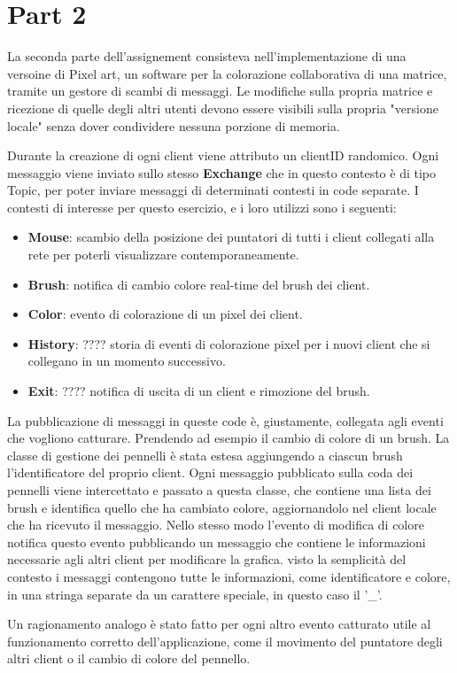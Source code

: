\chapter{Part 2}
\label{ch:into} %

La seconda parte dell'assignement consisteva nell'implementazione di una versoine di Pixel art, un software per la colorazione 
collaborativa di una matrice, tramite un gestore di scambi di messaggi. Le modifiche sulla propria matrice e ricezione di quelle degli altri utenti 
devono essere visibili sulla propria "versione locale" senza dover condividere nessuna porzione di memoria.

Durante la creazione di ogni client viene attributo un clientID randomico. Ogni messaggio viene inviato sullo stesso \textbf{Exchange} che in questo contesto
è di tipo Topic, per poter inviare messaggi di determinati contesti in code separate. I contesti di interesse per questo esercizio, e i loro utilizzi sono i seguenti: 
\begin{itemize}
    \item \textbf{Mouse}: scambio della posizione dei puntatori di tutti i client collegati alla rete per poterli visualizzare contemporaneamente.
    \item \textbf{Brush}: notifica di cambio colore real-time del brush dei client.
    \item \textbf{Color}: evento di colorazione di un pixel dei client.
    \item \textbf{History}: ???? storia di eventi di colorazione pixel per i nuovi client che si collegano in un momento successivo. %
    \item \textbf{Exit}: ???? notifica di uscita di un client e rimozione del brush.%
\end{itemize}

La pubblicazione di messaggi in queste code è, giustamente, collegata agli eventi che vogliono catturare.
Prendendo ad esempio il cambio di colore di un brush. La classe di gestione dei pennelli è stata estesa aggiungendo a ciascun brush l'identificatore del proprio client.
Ogni messaggio pubblicato sulla coda dei pennelli viene intercettato e passato a questa classe, che contiene una lista dei brush e identifica quello che ha cambiato colore, aggiornandolo nel client locale che ha ricevuto il messaggio. 
Nello stesso modo l'evento di modifica di colore notifica questo evento pubblicando un messaggio che contiene le informazioni
necessarie agli altri client per modificare la grafica. visto la semplicità del contesto i messaggi contengono tutte le informazioni, come identificatore e colore, in una stringa 
separate da un carattere speciale, in questo caso il '\_'.

Un ragionamento analogo è stato fatto per ogni altro evento catturato utile al funzionamento corretto dell'applicazione, come il movimento del puntatore 
degli altri client o il cambio di colore del pennello.
